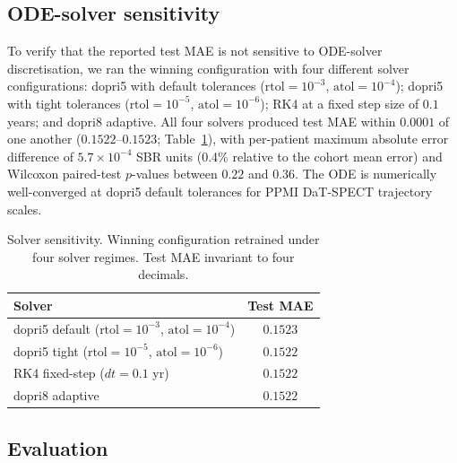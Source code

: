 \subsection{ODE-solver sensitivity}

To verify that the reported test MAE is not sensitive to ODE-solver discretisation, we ran the winning configuration with four different solver configurations: dopri5 with default tolerances ($\text{rtol}=10^{-3}$, $\text{atol}=10^{-4}$); dopri5 with tight tolerances ($\text{rtol}=10^{-5}$, $\text{atol}=10^{-6}$); RK4 at a fixed step size of $0.1$ years; and dopri8 adaptive. All four solvers produced test MAE within $0.0001$ of one another ($0.1522$--$0.1523$; Table~\ref{tab:p11_solver_sensitivity}), with per-patient maximum absolute error difference of $5.7 \times 10^{-4}$ SBR units (0.4\% relative to the cohort mean error) and Wilcoxon paired-test $p$-values between $0.22$ and $0.36$. The ODE is numerically well-converged at dopri5 default tolerances for PPMI DaT-SPECT trajectory scales.

\begin{table}[ht]
\centering
\caption{Solver sensitivity. Winning configuration retrained under four solver regimes. Test MAE invariant to four decimals.}
\label{tab:p11_solver_sensitivity}
\begin{tabular}{lc}
\toprule
Solver & Test MAE \\
\midrule
dopri5 default ($\text{rtol}=10^{-3}$, $\text{atol}=10^{-4}$) & $0.1523$ \\
dopri5 tight ($\text{rtol}=10^{-5}$, $\text{atol}=10^{-6}$) & $0.1522$ \\
RK4 fixed-step ($dt = 0.1$ yr) & $0.1522$ \\
dopri8 adaptive & $0.1522$ \\
\bottomrule
\end{tabular}
\end{table}

\subsection{Evaluation}

